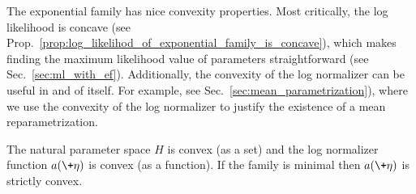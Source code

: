 \documentclass{article} %
\newcommand{\logNormalizerFunction}{a}
\newcommand{\naturalParam}{\+\eta}
\newcommand{\naturalParamSpace}{H}
\begin{document}
The exponential family has nice convexity properties. Most critically, the log likelihood is concave (see Prop.~\ref{prop:log_likelihod_of_exponential_family_is_concave}), which makes finding the maximum likelihood value of parameters straightforward (see Sec.~\ref{sec:ml_with_ef}).  Additionally, the convexity of the log normalizer can be useful in and of itself.  For example, see Sec.~\ref{sec:mean_parametrization}), where we use the convexity of the log normalizer to justify the existence of a mean reparametrization. 

\begin{proposition}
The natural parameter space $\naturalParamSpace$ is convex (as a set) and the log normalizer function $\logNormalizerFunction(\naturalParam)$ is convex (as a function). If the family is minimal then $\logNormalizerFunction(\naturalParam)$ is strictly convex.
\label{prop:basic_convexity_properties_of_the_exponential_family}
\end{proposition}
\end{document}
